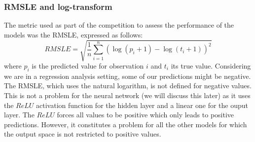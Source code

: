 \documentclass[sigplan,screen]{acmart}
\begin{document}

\subsubsection{RMSLE and log-transform}
The metric used as part of the competition to assess the performance of the models was the RMSLE, expressed as follows:
\begin{equation}
    RMSLE = \sqrt{\frac{1}{n}\sum_{i=1}^{n}(\log(p_{i}+1) - \log(t_{i} + 1))^{2}}
\end{equation}
where $p_{i}$ is the predicted value for observation $i$ and $t_{i}$ its true value. Considering we are in a regression analysis setting, some of our predictions might be negative. The RMSLE, which uses the natural logarithm, is not defined for negative values. This is not a problem for the neural network (we will discuss this later) as it uses the $ReLU$ activation function for the hidden layer and a linear one for the ouput layer. The $ReLU$ forces all values to be positive which only leads to positive predictions. However, it constitutes a problem for all the other models for which the output space is not restricted to positive values.
\end{document}
